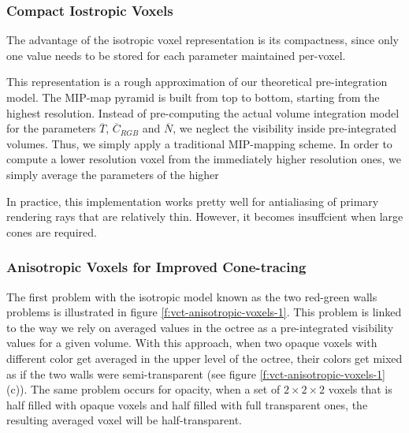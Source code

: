 \subsubsection{Compact Iostropic Voxels}
The advantage of the isotropic voxel representation is its compactness, since only one value needs to be stored for each parameter maintained per-voxel.

This representation is a rough approximation of our theoretical pre-integration model. The MIP-map pyramid is built from top to bottom, starting from the highest resolution. Instead of pre-computing the actual volume integration model for the parameters $\overline{T}$, $\overline{C}_{RGB}$ and $\overline{N}$, we neglect the visibility inside pre-integrated volumes. Thus, we simply apply a traditional MIP-mapping scheme. In order to compute a lower resolution voxel from the immediately higher resolution ones, we simply average the parameters of the higher 

In practice, this implementation works pretty well for antialiasing of primary rendering rays that are relatively thin. However, it becomes insuffcient when large cones are required. 




\subsubsection{Anisotropic Voxels for Improved Cone-tracing}
The first problem with the isotropic model known as the two red-green walls problems is illustrated in figure \ref{f:vct-anisotropic-voxels-1}. This problem is linked to the way we rely on averaged values in the octree as a pre-integrated visibility values for a given volume. With this approach, when two opaque voxels with different color get averaged in the upper level of the octree, their colors get mixed as if the two walls were semi-transparent (see figure \ref{f:vct-anisotropic-voxels-1}(c)). The same problem occurs for opacity, when a set of $2\times 2\times 2$ voxels that is half filled with opaque voxels and half filled with full transparent ones, the resulting averaged voxel will be half-transparent. 

